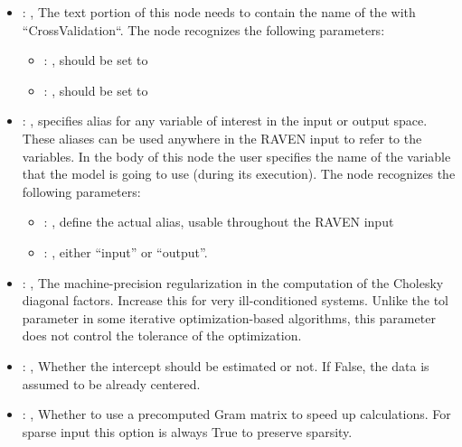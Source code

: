 \begin{itemize}
    \item {}: , 
      The text portion of this node needs to contain the name of the  with
               ``CrossValidation``.
      The  node recognizes the following parameters:
        \begin{itemize}
          \item {}: , 
            should be set to 
          \item {}: , 
            should be set to 
      \end{itemize}

    \item {}: , 
      specifies alias for         any variable of interest in the input or output space. These
      aliases can be used anywhere in the RAVEN input to         refer to the variables. In the body
      of this node the user specifies the name of the variable that the model is going to use
      (during its execution).
      The  node recognizes the following parameters:
        \begin{itemize}
          \item {}: , 
            define the actual alias, usable throughout the RAVEN input
          \item {}: , 
            either ``input'' or ``output''.
      \end{itemize}

    \item {}: , 
      The machine-precision regularization in the computation of the Cholesky
      diagonal factors. Increase this for very ill-conditioned systems. Unlike the tol
      parameter in some iterative optimization-based algorithms, this parameter does not
      control the tolerance of the optimization.

    \item {}: , 
      Whether the intercept should be estimated or not. If False,
      the data is assumed to be already centered.

    \item {}: , 
      Whether to use a precomputed Gram matrix to speed up calculations.
      For sparse input this option is always True to preserve sparsity.


\end{itemize}
